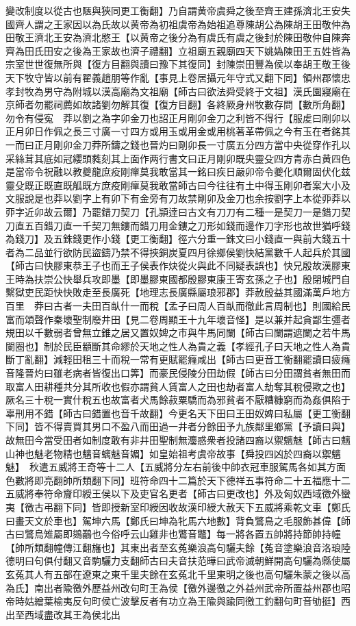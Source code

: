 變改制度以從古也陿與狹同更工衡翻】乃自謂黄帝虞舜之後至齊王建孫濟北王安失國齊人謂之王家因以為氏故以黄帝為初祖虞帝為始祖追尊陳胡公為陳胡王田敬仲為田敬王濟北王安為濟北愍王【以黄帝之後分為有虞氏有虞之後封於陳田敬仲自陳奔齊為田氏田安之後為王家故也濟子禮翻】立祖廟五親廟四天下姚媯陳田王五姓皆為宗室世世復無所與【復方目翻與讀曰豫下其復同】封陳崇田豐為侯以奉胡王敬王後天下牧守皆以前有翟義趙朋等作亂【事見上卷居攝元年守式又翻下同】領州郡懷忠孝封牧為男守為附城以漢高廟為文祖廟【師古曰欲法舜受終于文祖】漢氏園寢廟在京師者勿罷祠薦如故諸劉勿解其復【復方目翻】各終厥身州牧數存問【數所角翻】勿令有侵寃　莽以劉之為字卯金刀也詔正月剛卯金刀之利皆不得行【服䖍曰剛卯以正月卯日作佩之長三寸廣一寸四方或用玉或用金或用桃著革帶佩之今有玉在者銘其一而曰正月剛卯金刀莽所鑄之錢也晉灼曰剛卯長一寸廣五分四方當中央從穿作孔以采絲茸其底如冠纓頭蕤刻其上面作两行書文曰正月剛卯既央靈殳四方青赤白黄四色是當帝令祝融以教夔龍庶疫剛癉莫我敢當其一銘曰疾日嚴卯帝令夔化順爾固伏化兹靈殳既正既直既觚既方庶疫剛癉莫我敢當師古曰今往往有土中得玉剛卯者案大小及文服說是也莽以劉字上有卯下有金旁有刀故禁剛卯及金刀也余按劉字上本從丣莽以丣字近卯故云爾】乃罷錯刀契刀【孔頴逹曰古文有刀刀有二種一是契刀一是錯刀契刀直五百錯刀直一千契刀無鏤而錯刀用金鏤之刀形如錢而邊作刀字形也故世猶呼錢為錢刀】及五銖錢更作小錢【更工衡翻】徑六分重一銖文曰小錢直一與前大錢五十者為二品並行欲防民盜鑄乃禁不得挾銅炭夏四月徐鄉侯劉快結黨數千人起兵於其國【師古曰快膠東恭王子也而王子侯表作炔從火與此不同疑表誤也】快兄殷故漢膠東王時為扶崇公快舉兵攻即墨【即墨膠東國都殷膠東康王寄玄孫之子也】殷閉城門自繫獄吏民距快快敗走至長廣死【地理志長廣縣屬琅邪郡】莽赦殷益其國滿萬戶地方百里　莽曰古者一夫田百畒什一而稅【孟子曰周人百畒而徹此言周制也】則國給民富而頌聲作秦壞聖制廢井田【見二卷周顯王十九年壞音怪】是以兼并起貪鄙生彊者規田以千數弱者曾無立錐之居又置奴婢之市與牛馬同闌【師古曰闌謂遮闌之若牛馬闌圈也】制於民臣顓斷其命繆於天地之性人為貴之義【孝經孔子曰天地之性人為貴斷丁亂翻】減輕田租三十而稅一常有更賦罷癃咸出【師古曰更音工衡翻罷讀曰疲癃音隆晉灼曰雖老病者皆復出口筭】而豪民侵陵分田劫假【師古曰分田謂貧者無田而取富人田耕種共分其所收也假亦謂貧人賃富人之田也劫者富人劫奪其稅侵欺之也】厥名三十稅一實什稅五也故富者犬馬餘菽粟驕而為邪貧者不厭糟糠窮而為姦俱陷于辜刑用不錯【師古曰錯置也音千故翻】今更名天下田曰王田奴婢曰私屬【更工衡翻下同】皆不得賣買其男口不盈八而田過一井者分餘田予九族鄰里鄉黨【予讀曰與】故無田今當受田者如制度敢有非井田聖制無灋惑衆者投諸四裔以禦魑魅【師古曰魑山神也魅老物精也魑音螭魅音媚】如皇始祖考虞帝故事【舜投四凶於四裔以禦魑魅】　秋遣五威將王奇等十二人【五威將分左右前後中帥衣冠車服駕馬各如其方面色數將即亮翻帥所類翻下同】班符命四十二篇於天下德祥五事符命二十五福應十二五威將奉符命齎印綬王侯以下及吏官名更者【師古曰更改也】外及匈奴西域徼外蠻夷【徼古弔翻下同】皆即授新室印綬因收故漢印綬大赦天下五威將乘乾文車【鄭氏曰畫天文於車也】駕坤六馬【鄭氏曰坤為牝馬六地數】背負鷩鳥之毛服飾甚偉【師古曰鷩烏雉屬即鵕䴊也今俗呼云山雞非也鷩音鼈】每一將各置五帥將持節帥持幢【帥所類翻幢傳江翻旛也】其東出者至玄菟樂浪高句驪夫餘【菟音塗樂浪音洛琅陸德明曰句俱付翻又音駒驪力支翻師古曰夫音扶范曄曰武帝滅朝鮮開高句驪為縣使屬玄菟其人有五部在遼東之東千里夫餘在玄菟北千里東明之後也高句驪朱蒙之後以高為氏】南出者隃徼外歷益州改句町王為侯【徼外邊徼之外益州武帝所置益州郡也昭帝時姑繒葉榆夷反句町侯亡波擊反者有功立為王隃與踰同徼工釣翻句町音劬挺】西出至西域盡改其王為侯北出